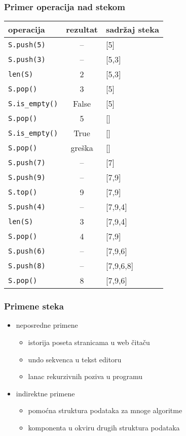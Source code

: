 \documentclass[compress,aspectratio=169]{beamer}
\begin{document}
\begin{frame}[fragile,shrink=10]
  \frametitle{Primer operacija nad stekom}
\begin{center}
\begin{tabular}{lcl}
\textbf{operacija} & \textbf{rezultat} & \textbf{sadržaj steka} \\
\hline \hline
\texttt{S.push(5)} & -- & [5] \\ 
\texttt{S.push(3)} & -- & [5,3] \\ 
\texttt{len(S)} & 2 & [5,3] \\ 
\texttt{S.pop()} & 3 & [5] \\ 
\texttt{S.is\_empty()} & False & [5] \\ 
\texttt{S.pop()} & 5 & [] \\ 
\texttt{S.is\_empty()} & True & [] \\ 
\texttt{S.pop()} & greška & [] \\ 
\texttt{S.push(7)} & -- & [7] \\ 
\texttt{S.push(9)} & -- & [7,9] \\ 
\texttt{S.top()} & 9 & [7,9] \\ 
\texttt{S.push(4)} & -- & [7,9,4] \\ 
\texttt{len(S)} & 3 & [7,9,4] \\ 
\texttt{S.pop()} & 4 & [7,9] \\ 
\texttt{S.push(6)} & -- & [7,9,6] \\ 
\texttt{S.push(8)} & -- & [7,9,6,8] \\ 
\texttt{S.pop()} & 8 & [7,9,6] \\ 
\end{tabular}
\end{center}
\end{frame}

\begin{frame}[fragile]
  \frametitle{Primene steka}
  \begin{itemize}
    \item neposredne primene
    \begin{itemize}
      \item istorija poseta stranicama u web čitaču
      \item undo sekvenca u tekst editoru
      \item lanac rekurzivnih poziva u programu
    \end{itemize}
    \item indirektne primene
    \begin{itemize}
      \item pomoćna struktura podataka za mnoge algoritme
      \item komponenta u okviru drugih struktura podataka
    \end{itemize}
  \end{itemize}
\end{frame}
\end{document}
